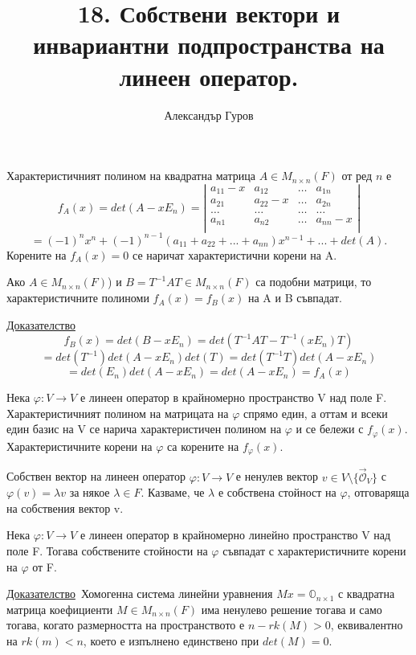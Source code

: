 \documentclass{article}
\title{18. Собствени вектори и инвариантни
подпространства на линеен оператор.}
\author{Александър Гуров}
\date{\datebulgarian{\today}}
\newcommand*{\nullvec}{\vec{\mathcal{O}}}
\newcommand{\dok}{\underline{Доказателство}\  }
\newcommand{\tvurdenie}[2]{
    \begin{tcolorbox}[title = #1 ,colframe = blue!70!black, colback = blue!10!white]
        #2
    \end{tcolorbox}
}
\newcommand{\opredelenie}[2]{
    \begin{tcolorbox}[title = #1 ,colframe = red!70!black, colback = red!10!white]
        #2
    \end{tcolorbox}
}
\begin{document}
\maketitle

\opredelenie{Определение 18.1}{
    Характеристичният полином на квадратна матрица $A \in M_{n\times n}(F)$ от ред $n$ е
    \[
        f_A(x)=det(A-xE_n)=\left|\begin{array}{cccc}
            a_{11}-x & a_{12}   & \dots & a_{1n}   \\
            a_{21}   & a_{22}-x & \dots & a_{2n}   \\
            \dots    & \dots    & \dots & \dots    \\
            a_{n1}   & a_{n2}   & \dots & a_{nn}-x \\
        \end{array}
        \right|
    \]
    \[
        = (-1)^nx^n + (-1)^{n-1}(a_{11} + a_{22} + ... + a_{nn})x^{n-1} + ... + det(A).
    \]
    Корените на $f_A(x) = 0$ се наричат характеристични корени на A.
}
\tvurdenie{Лема 19.2}{
    Ако $A \in M_{n\times n}(F)$) и $B = T^{-1}AT  \in M_{n\times n}(F)$ са подобни
    матрици, то характеристичните полиноми $f_A(x) = f_B(x)$ на A и B
    съвпадат.
}
\dok
\[
    f_B(x)=det(B-xE_n)=det(T^{-1}AT-T^{-1}(xE_n)T)
\]
\[
    =det(T^{-1})det(A-xE_n)det(T)=det(T^{-1}T)det(A-xE_n)
\]
\[
    =det(E_n)det(A-xE_n)=det(A-xE_n)=f_A(x)
\]
\opredelenie{Определение 18.3}{
    Нека $\varphi : V \rightarrow V$ е линеен оператор в крайномерно пространство V над поле F.
    Характеристичният полином на матрицата на $\varphi$ спрямо един, а оттам и всеки един базис
    на V се нарича характеристичен полином на $\varphi$ и се бележи с $f_{\varphi}(x)$.
    Характеристичните корени на $\varphi$ са корените на $f_{\varphi}(x)$.
}
\opredelenie{Определение 18.4}{
    Собствен вектор на линеен оператор $\varphi : V \rightarrow V$
    е ненулев вектор $v \in V \setminus \{\nullvec_V\}$ с $\varphi(v) = \lambda v$ за някое $\lambda \in F$. Казваме,
    че $\lambda$ е собствена стойност на $\varphi$, отговаряща на собствения вектор v.
}
\tvurdenie{Лема 18.5}{
    Нека $\varphi : V \rightarrow V$ е линеен оператор в крайномерно
    линейно пространство V над поле F. Тогава собствените стойности
    на $\varphi$ съвпадат с характеристичните корени на $\varphi$ от F.
}

\dok Хомогенна система линейни уравнения $Mx=\mathbb{O}_{n\times 1}$ с квадратна матрица
коефициенти $M\in M_{n\times n}(F)$ има ненулево решение тогава и само тогава, когато
размерността на пространството е $n-rk(M)>0$, еквивалентно на $rk(m)<n$, което е
изпълнено единствено при $det(M)=0$.
\end{document}
